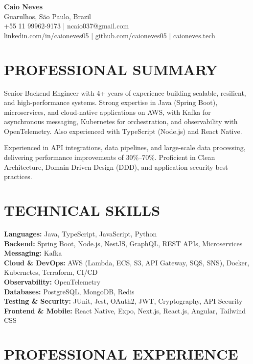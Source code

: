 \documentclass[10pt,letterpaper]{article}
\begin{document}
\begin{center}
    \textbf{\large Caio Neves} \\
    Guarulhos, São Paulo, Brazil \\
    +55 11 99962-9173 \;|\; ncaio037@gmail.com \\
    \href{https://www.linkedin.com/in/caioneves05}{linkedin.com/in/caioneves05} \;|\;
    \href{https://github.com/caioneves05}{github.com/caioneves05} \;|\;
    \href{http://caioneves.tech}{caioneves.tech}
\end{center}

\section{PROFESSIONAL SUMMARY}
Senior Backend Engineer with 4+ years of experience building scalable, resilient, and high-performance systems. Strong expertise in Java (Spring Boot), microservices, and cloud-native applications on AWS, with Kafka for asynchronous messaging, Kubernetes for orchestration, and observability with OpenTelemetry. Also experienced with TypeScript (Node.js) and React Native.

Experienced in API integrations, data pipelines, and large-scale data processing, delivering performance improvements of 30\%--70\%. Proficient in Clean Architecture, Domain-Driven Design (DDD), and application security best practices.

\section{TECHNICAL SKILLS}
\textbf{Languages:} Java, TypeScript, JavaScript, Python \\
\textbf{Backend:} Spring Boot, Node.js, NestJS, GraphQL, REST APIs, Microservices \\
\textbf{Messaging:} Kafka \\
\textbf{Cloud \& DevOps:} AWS (Lambda, ECS, S3, API Gateway, SQS, SNS), Docker, Kubernetes, Terraform, CI/CD \\
\textbf{Observability:} OpenTelemetry \\
\textbf{Databases:} PostgreSQL, MongoDB, Redis \\
\textbf{Testing \& Security:} JUnit, Jest, OAuth2, JWT, Cryptography, API Security \\
\textbf{Frontend \& Mobile:} React Native, Expo, Next.js, React.js, Angular, Tailwind CSS

\section{PROFESSIONAL EXPERIENCE}
\end{document}
